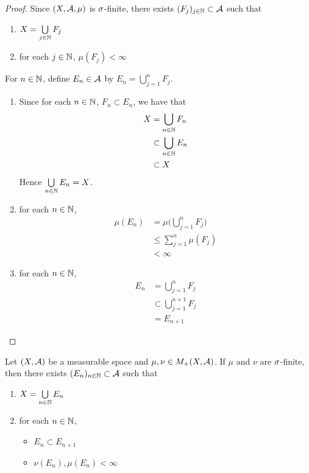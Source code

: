 \documentclass{book}
\begin{document}
	\begin{proof}
		Since $(X, \mathcal{A}, \mu)$ is $\sigma$-finite, there exists $(F_j)_{j \in \mathbb{N}} \subset \mathcal{A}$ such that 
		\begin{enumerate}
			\item $X = \bigcup\limits_{j \in \mathbb{N}} F_j$
			\item for each $j \in \mathbb{N}$, $\mu(F_j) < \infty$ 
		\end{enumerate}
		For $n \in \mathbb{N}$, define $E_n \in \mathcal{A}$ by $E_n = \bigcup\limits_{j=1}^n F_j$. 
		\begin{enumerate}
			\item Since for each $n \in \mathbb{N}$, $F_n \subset E_n$, we have that 
			\begin{align*}
				X
				& = \bigcup\limits_{n \in \mathbb{N}} F_n \\
				& \subset \bigcup\limits_{n \in \mathbb{N}} E_n \\
				& \subset X
			\end{align*}
			Hence $\bigcup\limits_{n \in \mathbb{N}} E_n = X$.
			\item for each $n \in \mathbb{N}$, 
			\begin{align*}
				\mu(E_n)
				& = \mu \bigg( \bigcup_{j=1}^n F_j\bigg) \\
				& \leq \sum\limits_{j=1}^n \mu(F_j) \\
				& < \infty 
			\end{align*}
			\item for each $n \in \mathbb{N}$, 
			\begin{align*}
				E_n
				& = \bigcup_{j=1}^n F_j \\
				& \subset \bigcup_{j=1}^{n+1} F_j \\
				& = E_{n+1}
			\end{align*}
		\end{enumerate}
	\end{proof}
	
	\begin{ex} 
		Let $(X, \mathcal{A})$ be a measurable space and $\mu, \nu \in M_+(X, \mathcal{A})$. If $\mu$ and $\nu$ are $\sigma$-finite, then there exists $(E_n)_{n \in \mathbb{N}} \subset \mathcal{A}$ such that 
		\begin{enumerate}
			\item $X = \bigcup\limits_{n \in \mathbb{N}} E_n$
			\item for each $n \in \mathbb{N}$,
			\begin{itemize}
				\item $E_n \subset E_{n+1}$
				\item $\nu(E_n), \mu(E_n) < \infty$
			\end{itemize}
		\end{enumerate} 
	\end{ex}
	
\end{document}
